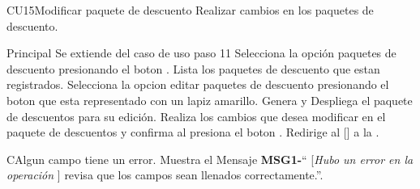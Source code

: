 \begin{UseCase}{CU15}{Modificar paquete de descuento}{
		Realizar cambios en los paquetes de descuento.
	}
	\end{UseCase}




	\begin{UCtrayectoria}{Principal}
		\UCpaso Se extiende del caso de uso  paso 11
		\UCpaso[\UCactor] Selecciona la opción paquetes de descuento presionando el boton .
		\UCpaso Lista los paquetes de descuento que estan registrados. 
		\UCpaso[\UCactor] Selecciona la opcion editar paquetes de descuento presionando el boton  que esta representado con un lapiz amarillo.
		\UCpaso Genera y Despliega el paquete de descuentos para su edición. 
		\UCpaso[\UCactor] Realiza los cambios que desea modificar en el paquete de descuentos y confirma al presiona el boton . 
		\UCpaso Redirige al [\UCactor] a la  .
	\end{UCtrayectoria}




\begin{UCtrayectoriaA}{C}{Algun campo tiene un error.}
			\UCpaso Muestra el Mensaje {\bf MSG1-}`` [{\em Hubo un error en la operación }] revisa que los campos sean llenados correctamente.''.
			
		\end{UCtrayectoriaA}
